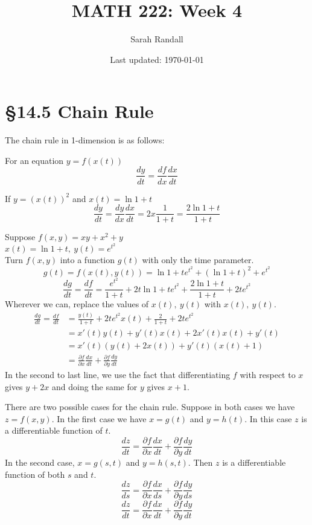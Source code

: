\documentclass[12 pt]{article}
\author{Sarah Randall}
\date{Last updated: \today}
\title{MATH 222: Week 4}
\begin{document}
    \onehalfspacing
    \maketitle
    \tableofcontents
    \section{\S 14.5 Chain Rule}
        The chain rule in 1-dimension is as follows:

        For an equation $y=f(x(t))$
        $$\frac{dy}{dt}=\frac{df}{dx}\frac{dx}{dt}$$
        \begin{exmp*}
            If $y=(x(t))^2$ and $x(t)=\ln{1+t}$\\
            $$\frac{dy}{dt}=\frac{dy}{dx}\frac{dx}{dt}=2x\frac{1}{1+t}=\frac{2\ln{1+t}}{1+t}$$
        \end{exmp*}

        \begin{exmp*}
            Suppose $f(x,y)=xy+x^2+y$\\
            $x(t)=\ln{1+t},\ y(t)=e^{t^2}$\\
            Turn $f(x,y)$ into a function $g(t)$ with only the time parameter.
            $$g(t)=f(x(t),y(t))=\ln{1+t}e^{t^2}+(\ln{1+t})^2+e^{t^2}$$
            $$\frac{dg}{dt}=\frac{df}{dt}=\frac{e^{t^2}}{1+t}+2t\ln{1+t}e^{t^2}+\frac{2\ln{1+t}}{1+t}+2te^{t^2}$$
            Wherever we can, replace the values of $x(t),\ y(t)$ with $x(t),\ y(t)$.
            \begin{align*}
                \frac{dg}{dt}=\frac{df}{dt}&=\frac{y(t)}{1+t}+2te^{t^2}x(t)+\frac{2}{1+t}+2te^{t^2}\\
                &=x'(t)y(t)+y'(t)x(t)+2x'(t)x(t)+y'(t)\\
                &=x'(t)(y(t)+2x(t))+y'(t)(x(t)+1)\\
                &=\frac{\partial f}{\partial x}\frac{dx}{dt}+\frac{\partial f}{\partial y}\frac{dy}{dt}
            \end{align*}
            In the second to last line, we use the fact that differentiating $f$ with respect to $x$ gives $y+2x$ and doing the same for $y$ gives $x+1$.
        \end{exmp*}

        There are two possible cases for the chain rule. Suppose in both cases we have $z=f(x,y)$. In the first case we have $x=g(t)$ and $y=h(t)$. In this case $z$ is a differentiable function of $t$.
        $$\frac{dz}{dt}=\frac{\partial f}{\partial x}\frac{dx}{dt}+\frac{\partial f}{\partial y}\frac{dy}{dt}$$
        In the second case, $x=g(s,t)$ and $y=h(s,t)$. Then $z$ is a differentiable function of both $s$ and $t$.
        $$\frac{dz}{ds}=\frac{\partial f}{\partial x}\frac{dx}{ds}+\frac{\partial f}{\partial y}\frac{dy}{ds}$$
        $$\frac{dz}{dt}=\frac{\partial f}{\partial x}\frac{dx}{dt}+\frac{\partial f}{\partial y}\frac{dy}{dt}$$
\end{document}
